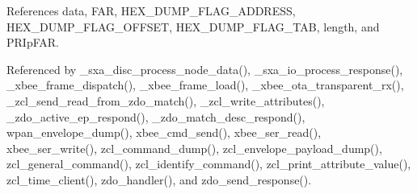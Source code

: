 References data, F\-A\-R, H\-E\-X\-\_\-\-D\-U\-M\-P\-\_\-\-F\-L\-A\-G\-\_\-\-A\-D\-D\-R\-E\-S\-S, H\-E\-X\-\_\-\-D\-U\-M\-P\-\_\-\-F\-L\-A\-G\-\_\-\-O\-F\-F\-S\-E\-T, H\-E\-X\-\_\-\-D\-U\-M\-P\-\_\-\-F\-L\-A\-G\-\_\-\-T\-A\-B, length, and P\-R\-Ip\-F\-A\-R.



Referenced by \-\_\-sxa\-\_\-disc\-\_\-process\-\_\-node\-\_\-data(), \-\_\-sxa\-\_\-io\-\_\-process\-\_\-response(), \-\_\-xbee\-\_\-frame\-\_\-dispatch(), \-\_\-xbee\-\_\-frame\-\_\-load(), \-\_\-xbee\-\_\-ota\-\_\-transparent\-\_\-rx(), \-\_\-zcl\-\_\-send\-\_\-read\-\_\-from\-\_\-zdo\-\_\-match(), \-\_\-zcl\-\_\-write\-\_\-attributes(), \-\_\-zdo\-\_\-active\-\_\-ep\-\_\-respond(), \-\_\-zdo\-\_\-match\-\_\-desc\-\_\-respond(), wpan\-\_\-envelope\-\_\-dump(), xbee\-\_\-cmd\-\_\-send(), xbee\-\_\-ser\-\_\-read(), xbee\-\_\-ser\-\_\-write(), zcl\-\_\-command\-\_\-dump(), zcl\-\_\-envelope\-\_\-payload\-\_\-dump(), zcl\-\_\-general\-\_\-command(), zcl\-\_\-identify\-\_\-command(), zcl\-\_\-print\-\_\-attribute\-\_\-value(), zcl\-\_\-time\-\_\-client(), zdo\-\_\-handler(), and zdo\-\_\-send\-\_\-response().

